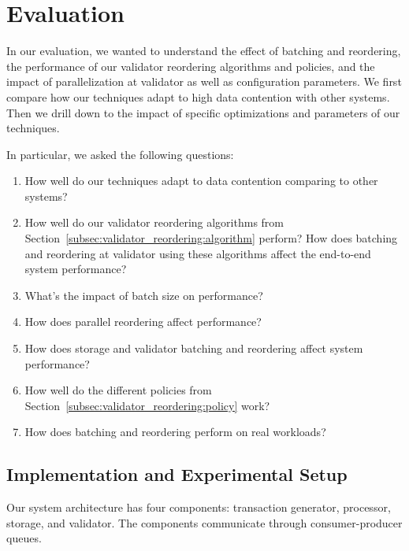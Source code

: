 \section{Evaluation}\label{sec:experiments}
In our evaluation, we wanted to understand the effect of batching and reordering, the performance of our validator reordering algorithms and policies, and the impact of parallelization at validator as well as configuration parameters. We first compare how our techniques adapt to high data contention with other systems. Then we drill down to the impact of specific optimizations and parameters of our techniques.

In particular, we asked the following questions:
\begin{enumerate}[leftmargin=*]
\item How well do our techniques adapt to data contention comparing to other systems?
\item How well do our validator reordering algorithms from Section~\ref{subsec:validator_reordering:algorithm} perform? How does batching and reordering at validator using these algorithms affect the end-to-end system performance?
\item What's the impact of batch size on performance? 
\item How does parallel reordering affect performance?
\item How does storage and validator batching and reordering
  affect system performance?
\item How well do the different policies from Section~\ref{subsec:validator_reordering:policy} work?
\item How does batching and reordering perform on real workloads?
\end{enumerate}

\subsection{Implementation and Experimental Setup}
\label{subsec:experiment:implementation}


Our system architecture has four components: transaction generator, processor, storage, and validator. The components communicate through consumer-producer queues.

